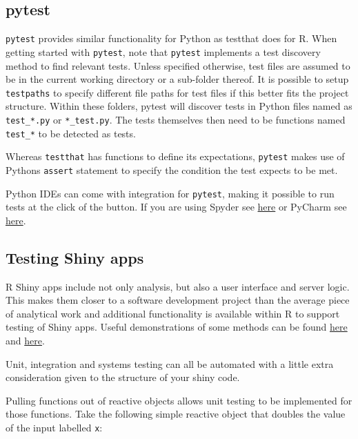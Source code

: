 \documentclass[
]{book}
\begin{document}
\hypertarget{pytest}{%
\subsection{pytest}\label{pytest}}

\texttt{pytest} provides similar functionality for Python as testthat does for R. When getting started with \texttt{pytest}, note that \texttt{pytest} implements a test discovery method to find relevant tests. Unless specified otherwise, test files are assumed to be in the current working directory or a sub-folder thereof. It is possible to setup \texttt{testpaths} to specify different file paths for test files if this better fits the project structure. Within these folders, pytest will discover tests in Python files named as \texttt{test\_*.py} or \texttt{*\_test.py}. The tests themselves then need to be functions named \texttt{test\_*} to be detected as tests.

Whereas \texttt{testthat} has functions to define its expectations, \texttt{pytest} makes use of Pythons \texttt{assert} statement to specify the condition the test expects to be met.

Python IDEs can come with integration for \texttt{pytest}, making it possible to run tests at the click of the button. If you are using Spyder see \href{https://www.spyder-ide.org/blog/introducing-unittest-plugin/}{here} or PyCharm see \href{https://www.jetbrains.com/help/pycharm/pytest.html}{here}.

\hypertarget{testing-shiny-apps}{%
\subsection{Testing Shiny apps}\label{testing-shiny-apps}}

R Shiny apps include not only analysis, but also a user interface and server logic. This makes them closer to a software development project than the average piece of analytical work and additional functionality is available within R to support testing of Shiny apps. Useful demonstrations of some methods can be found \href{https://shiny.rstudio.com/articles/testing-overview.html}{here} and \href{https://mastering-shiny.org/scaling-testing.html}{here}.

Unit, integration and systems testing can all be automated with a little extra consideration given to the structure of your shiny code.

Pulling functions out of reactive objects allows unit testing to be implemented for those functions. Take the following simple reactive object that doubles the value of the input labelled \texttt{x}:
\end{document}
